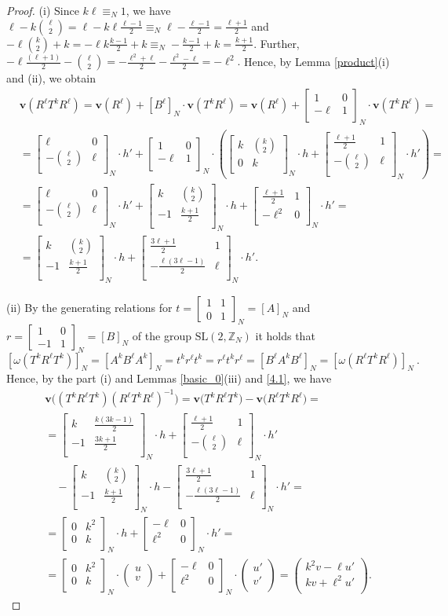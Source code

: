 \documentclass[10pt]{amsart}
\theoremstyle{plain}
\theoremstyle{definition}
\theoremstyle{remark}%
\newcommand{\Z}{\mathbb{Z}}
\newcommand{\f}{\mathbf{v}}
\newcommand{\g}{\omega}
\newcommand{\SL}{\mathrm{SL}}
\newcommand{\matN}[4]{\left[\begin{array}{cc}
 #1 & #2\\
 #3 & #4\\
\end{array}\right]_N}
\newcommand{\vc}[2]{\left(\begin{array}{c}
 #1 \\
 #2\\
\end{array}\right)}
\begin{document}
\begin{proof}
 (i) Since $k\ell\equiv_N 1$, we have $\ell-k{\ell\choose 2}=\ell-k\ell\frac{\ell-1}{2}\equiv_{N} \ell-\frac{\ell-1}{2}= \frac{\ell+1}{2}$ and $-\ell{k\choose 2}+k=-\ell k\frac{k-1}{2}+k\equiv_{N} -\frac{k-1}{2}+k= \frac{k+1}{2}$. Further, $-\ell\frac{(\ell+1)}{2}-{\ell\choose 2}= -\frac{\ell^2+\ell}{2}-\frac{\ell^2-\ell}{2}=-\ell^2.$ Hence, by Lemma \ref{product}(i) and (ii), we obtain
 \begin{align*}
 &\f(R^\ell T^k R^\ell)=\f(R^\ell)+[B^\ell]_N \cdot\f(T^k R^{\ell})=\f(R^\ell)+\matN{1}{0}{-\ell}{1} \cdot\f(T^k R^{\ell})=\\
 &=\matN{\ell}{0}{-{\ell\choose 2}}{\ell}\cdot h'+\matN{1}{0}{-\ell}{1}\cdot\left(\matN{k}{{k\choose 2}}{0}{k}\cdot h+\matN{\frac{\ell+1}{2}}{1}{-{\ell\choose 2}}{\ell}\cdot h'\right)=\\
 &=\matN{\ell}{0}{-{\ell\choose 2}}{\ell}\cdot h'+\matN{k}{{k\choose 2}}{-1}{\frac{k+1}{2}}\cdot h+\matN{\frac{\ell+1}{2}}{1}{-\ell^2}{0}\cdot h'=\\
&=\matN{k}{{k\choose 2}}{-1}{\frac{k+1}{2}}\cdot h+\matN{\frac{3\ell+1}{2}}{1}{-\frac{\ell(3\ell-1)}{2}}{\ell}\cdot h'.
\end{align*}
  
  (ii)  By the generating relations for 
$t=\left[\begin{smallmatrix}1 & 1\\ 0 & 1\end{smallmatrix}\right]_{N}=[A]_N$ and $r=\left[\begin{smallmatrix}1 & 0\\ -1 & 1\end{smallmatrix}\right]_{N}=[B]_N$ of the group $\SL(2,\Z_{N})$ it holds that $$[\g(T^k R^\ell T^k)]_{N}=\left[A^kB^\ell A^k\right]_N=t^kr^{\ell}t^k=r^{\ell}t^{k}r^{\ell}=\left[B^{\ell} A^k B^{\ell}\right]_N=\left[\g\left(R^\ell T^kR^\ell\right)\right]_N\ .$$ 
Hence, by the part (i) and Lemmas \ref{basic_0}(iii) and \ref{4.1}, we have
\begin{align*}
&\f\Big(\left(T^k R^\ell T^k\right)\left(R^\ell T^kR^\ell\right)^{-1}\Big)=\f\Big(T^k R^\ell T^k\Big)-\f\Big(R^\ell T^kR^\ell\Big)=\\
&=\matN{k}{\frac{k(3k-1)}{2}}{-1}{\frac{3k+1}{2}}\cdot h+\matN{\frac{\ell+1}{2}}{1}{-{\ell\choose 2}}{\ell}\cdot h'\\
&\quad-\matN{k}{{k\choose 2}}{-1}{\frac{k+1}{2}}\cdot h-\matN{\frac{3\ell+1}{2}}{1}{-\frac{\ell(3\ell-1)}{2}}{\ell}\cdot h'=\\
&=\matN{0}{k^2}{0}{k}\cdot h+\matN{-\ell}{0}{\ell^2}{0}\cdot h'=\\
&=\matN{0}{k^2}{0}{k}\cdot \vc{u}{v}+\matN{-\ell}{0}{\ell^2}{0}\cdot \vc{u'}{v'}=\vc{k^2v-\ell u'}{kv+\ell^2 u'}.
\end{align*}
\end{proof}
\end{document}
